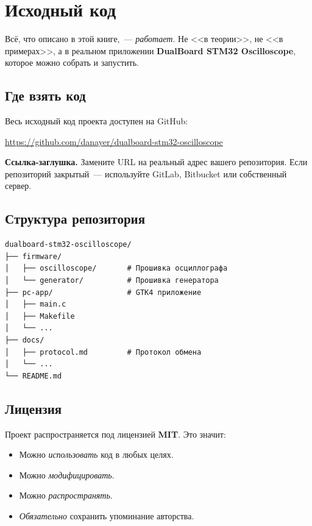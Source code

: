 
\chapter{Исходный код}
\label{app:sources}

Всё, что описано в этой книге,~--- \emph{работает}. Не <<в теории>>,
не <<в примерах>>, а в реальном приложении \textbf{DualBoard STM32
Oscilloscope}, которое можно собрать и запустить.

\section{Где взять код}

Весь исходный код проекта доступен на GitHub:

\begin{center}
\url{https://github.com/danayer/dualboard-stm32-oscilloscope}
\end{center}

\begin{notebox}
\textbf{Ссылка-заглушка.} Замените URL на реальный адрес вашего
репозитория. Если репозиторий закрытый~--- используйте GitLab,
Bitbucket или собственный сервер.
\end{notebox}

\section{Структура репозитория}

\begin{verbatim}
dualboard-stm32-oscilloscope/
├── firmware/
│   ├── oscilloscope/       # Прошивка осциллографа
│   └── generator/          # Прошивка генератора
├── pc-app/                 # GTK4 приложение
│   ├── main.c
│   ├── Makefile
│   └── ...
├── docs/
│   ├── protocol.md         # Протокол обмена
│   └── ...
└── README.md
\end{verbatim}

\section{Лицензия}

Проект распространяется под лицензией \textbf{MIT}. Это значит:

\begin{itemize}
    \item Можно \emph{использовать} код в любых целях.
    \item Можно \emph{модифицировать}.
    \item Можно \emph{распространять}.
    \item \emph{Обязательно} сохранить упоминание авторства.
\end{itemize}

